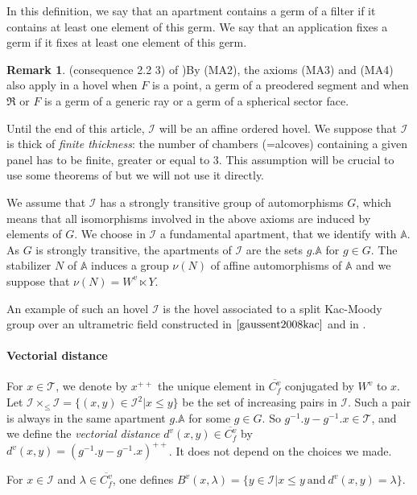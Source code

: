 \documentclass[12pt]{article}
\theoremstyle{plain}
\theoremstyle{definition}
\newtheorem{rque}[thm]{Remark}
\newcommand{\A}{\mathbb{A}}
\newcommand{\I}{\mathcal{I}}
\begin{document}
In this definition, we say that an apartment contains a germ of a filter if it contains at least one element of this germ. We say that an application fixes a germ if it fixes at least one element of this germ.

\begin{rque}(consequence 2.2 3) of \cite{rousseau2011masures})\label{rque axioms MA3 et MA4 modifiés}
By (MA2), the axioms (MA3) and (MA4) also apply in a hovel when $F$ is a point, a germ of a preodered segment and when $\mathfrak{R}$ or $F$ is a germ of a generic ray or a germ of a spherical sector face.
\end{rque}

\vspace{3mm}
Until the end of this article, $\I$ will be an affine ordered hovel. We suppose that $\I$ is thick of \textit{finite thickness}: the number of chambers (=alcoves) containing a given panel has to be finite, greater or equal to $3$. This assumption will be crucial to use some theorems of \cite{gaussent2014spherical} but we will not use it directly. 

We assume that $\I$ has a strongly transitive group of automorphisms $G$, which means that all isomorphisms involved in the above axioms are induced by elements of $G$. We choose in $\I$ a fundamental apartment, that we identify with $\A$. As $G$ is strongly transitive, the apartments of $\I$ are the sets $g.\A$ for $g\in G$. The stabilizer $N$ of $\A$ induces a group $\nu(N)$ of affine automorphisms of $\A$ and we suppose that $\nu(N)=W^v\ltimes Y$.

An example of such an hovel $\I$ is the hovel associated to a split Kac-Moody group over an ultrametric field constructed in $\cite{gaussent2008kac}$ and in \cite{rousseau2012almost}.

\paragraph{Vectorial distance}
For $x\in \mathcal{T}$, we denote by $x^{++}$ the unique element in $\overline{C^v_f}$ conjugated by $W^v$ to $x$. Let $\I\times_{\leq}\I=\{(x,y)\in \I^2|x\leq y\}$ be the set of increasing pairs in $\I$. Such a pair is always in the same apartment $g.\A$ for some $g\in G$. So $g^{-1}.y-g^{-1}.x\in \mathcal{T}$, and we define the \textit{vectorial distance} $d^v(x,y)\in\overline{C_f^v}$ by $d^v(x,y)=(g^{-1}.y-g^{-1}.x)^{++}$. It does not depend on the choices we made.

For $x\in \I$ and $\lambda\in \overline{C_f^v}$, one defines $B^v(x,\lambda)=\{y\in \I|x\leq y\mathrm{\ and\ }d^v(x,y)=\lambda\}$.
\end{document}

